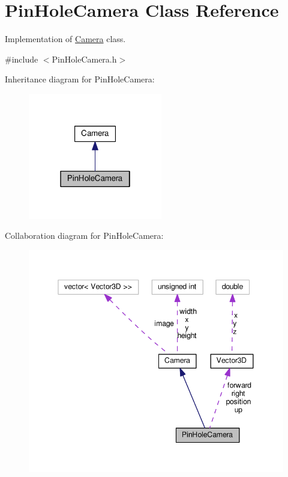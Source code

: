 \hypertarget{classPinHoleCamera}{}\section{Pin\+Hole\+Camera Class Reference}
\label{classPinHoleCamera}


Implementation of \hyperlink{classCamera}{Camera} class.  




{\ttfamily \#include $<$Pin\+Hole\+Camera.\+h$>$}



Inheritance diagram for Pin\+Hole\+Camera\+:\nopagebreak
\begin{figure}[H]
\begin{center}
\leavevmode
\includegraphics[width=166pt]{classPinHoleCamera__inherit__graph}
\end{center}
\end{figure}


Collaboration diagram for Pin\+Hole\+Camera\+:\nopagebreak
\begin{figure}[H]
\begin{center}
\leavevmode
\includegraphics[width=345pt]{classPinHoleCamera__coll__graph}
\end{center}
\end{figure}
